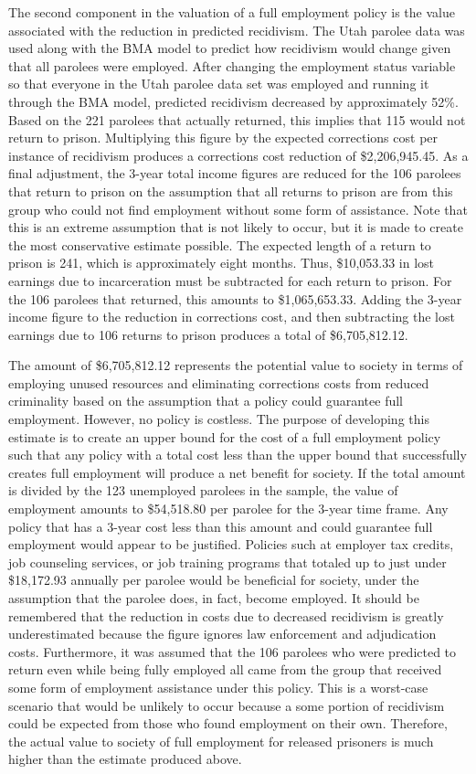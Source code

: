 The second component in the valuation of a full employment policy is the value associated with the reduction in predicted recidivism.  The Utah parolee data was used along with the BMA model to predict how recidivism would change given that all parolees were employed.  After changing the employment status variable so that everyone in the Utah parolee data set was employed and running it through the BMA model, predicted recidivism decreased by approximately 52\%.  Based on the 221 parolees that actually returned, this implies that 115 would not return to prison.  Multiplying this figure by the expected corrections cost per instance of recidivism produces a corrections cost reduction of \$2,206,945.45.  As a final adjustment, the 3-year total income figures are reduced for the 106 parolees that return to prison on the assumption that all returns to prison are from this group who could not find employment without some form of assistance.  Note that this is an extreme assumption that is not likely to occur, but it is made to create the most conservative estimate possible.  The expected length of a return to prison is 241, which is approximately eight months.  Thus, \$10,053.33 in lost earnings due to incarceration must be subtracted for each return to prison.  For the 106 parolees that returned, this amounts to \$1,065,653.33.  Adding the 3-year income figure to the reduction in corrections cost, and then subtracting the lost earnings due to 106 returns to prison produces a total of  \$6,705,812.12.

The amount of \$6,705,812.12 represents the potential value to society in terms of employing unused resources and eliminating corrections costs from reduced criminality based on the assumption that a policy could guarantee full employment.  However, no policy is costless.  The purpose of developing this estimate is to create an upper bound for the cost of a full employment policy such that any policy with a total cost less than the upper bound that successfully creates full employment will produce a net benefit for society.  If the total amount is divided by the 123 unemployed parolees in the sample, the value of employment amounts to \$54,518.80 per parolee for the 3-year time frame.  Any policy that has a 3-year cost less than this amount and could guarantee full employment would appear to be justified.  Policies such at employer tax credits, job counseling services, or job training programs that totaled up to just under \$18,172.93 annually per parolee would be beneficial for society, under the assumption that the parolee does, in fact, become employed.  It should be remembered that the reduction in costs due to decreased recidivism is greatly underestimated because the figure ignores law enforcement and adjudication costs.  Furthermore, it was assumed that the 106 parolees who were predicted to return even while being fully employed all came from the group that received some form of employment assistance under this policy.  This is a worst-case scenario that would be unlikely to occur because a some portion of recidivism could be expected from those who found employment on their own.  Therefore, the actual value to society of full employment for released prisoners is much higher than the estimate produced above.

